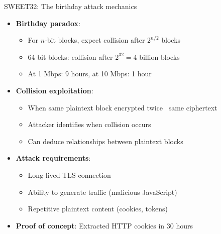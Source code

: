 \documentclass[aspectratio=169, lualatex, handout]{beamer}
\begin{document}
\begin{frame}{SWEET32: The birthday attack mechanics}
	\begin{itemize}
		\item \textbf{Birthday paradox}:
		      \begin{itemize}
			      \item For $n$-bit blocks, expect collision after $2^{n/2}$ blocks
			      \item 64-bit blocks: collision after $2^{32} = 4$ billion blocks
			      \item At 1 Mbps: 9 hours, at 10 Mbps: 1 hour
		      \end{itemize}
		\item \textbf{Collision exploitation}:
		      \begin{itemize}
			      \item When same plaintext block encrypted twice \rightarrow\ same ciphertext
			      \item Attacker identifies when collision occurs
			      \item Can deduce relationships between plaintext blocks
		      \end{itemize}
		\item \textbf{Attack requirements}:
		      \begin{itemize}
			      \item Long-lived TLS connection
			      \item Ability to generate traffic (malicious JavaScript)
			      \item Repetitive plaintext content (cookies, tokens)
		      \end{itemize}
		\item \textbf{Proof of concept}: Extracted HTTP cookies in 30 hours
	\end{itemize}
\end{frame}
\end{document}
